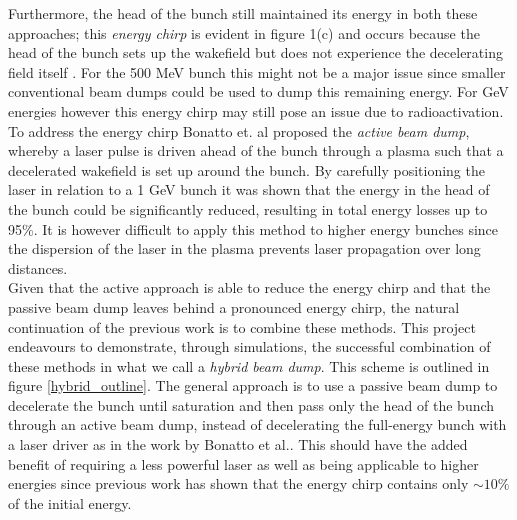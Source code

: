 Furthermore, the head of the bunch still maintained its energy in both these approaches; this \textit{energy chirp} is evident in figure 1(c) and occurs because the head of the bunch sets up the wakefield but does not experience the decelerating field itself \cite{Wu2010}. For the 500 MeV bunch this might not be a major issue since smaller conventional beam dumps could be used to dump this remaining energy. For GeV energies however this energy chirp may still pose an issue due to radioactivation. 
To address the energy chirp Bonatto et. al \cite{Bonatto2015} proposed the \textit{active beam dump}, whereby a laser pulse is driven ahead of the bunch through a plasma such that a decelerated wakefield is set up around the bunch. 
By carefully positioning the laser in relation to a 1 GeV bunch it was shown that the energy in the head of the bunch could be significantly reduced, resulting in total energy losses up to 95\%. It is however difficult to apply this method to higher energy bunches since the dispersion of the laser in the plasma prevents laser propagation over long distances. \\
\indent Given that the active approach is able to reduce the energy chirp and that the passive beam dump leaves behind a pronounced energy chirp, the natural continuation of the previous work is to combine these methods. This project endeavours to demonstrate, through simulations, the successful combination of these methods in what we call a \textit{hybrid beam dump}. This scheme is outlined in figure \ref{hybrid_outline}.  The general approach is to use a passive beam dump to decelerate the bunch until saturation and then pass only the head of the bunch through an active beam dump, instead of decelerating the full-energy bunch with a laser driver as in the work by Bonatto et al.. This should have the added benefit of requiring a less powerful laser as well as being applicable to higher energies since previous work has shown that the energy chirp contains only $\sim 10\%$ of the initial energy. 








